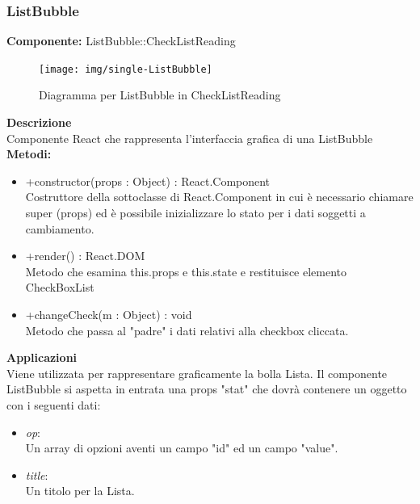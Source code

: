 \subsubsection{ListBubble}
\textbf{Componente:}  ListBubble::CheckListReading\\
   \FloatBarrier
   \begin{figure}[ht]
   \centering
   \texttt{[image: img/single-ListBubble]}
   \caption{{Diagramma per ListBubble in CheckListReading}}
\end{figure}
\FloatBarrier
\textbf{Descrizione}\\
Componente React che rappresenta l'interfaccia grafica di una ListBubble
\\
\textbf{Metodi:} 
\begin{itemize}
\item +constructor(props : Object) : React.Component 
\\
Costruttore della sottoclasse di React.Component in cui è necessario chiamare super (props) ed è possibile inizializzare lo stato per i dati soggetti a cambiamento.

\item +render() : React.DOM 
\\
Metodo che esamina this.props e this.state e restituisce elemento CheckBoxList 

\item +changeCheck(m : Object) : void \\
Metodo che passa al "padre" i dati relativi alla checkbox cliccata.
\end{itemize} 


\textbf{Applicazioni}\\
Viene utilizzata per rappresentare graficamente la bolla Lista.
Il componente ListBubble si aspetta in entrata una props "stat" che dovrà contenere un oggetto con i seguenti dati: \\
\begin{itemize}
\item \textit{op}:
\\
Un array di opzioni aventi un campo "id" ed un campo "value".
\item \textit{title}:
\\
Un titolo per la Lista.
\end{itemize} 


\clearpage

